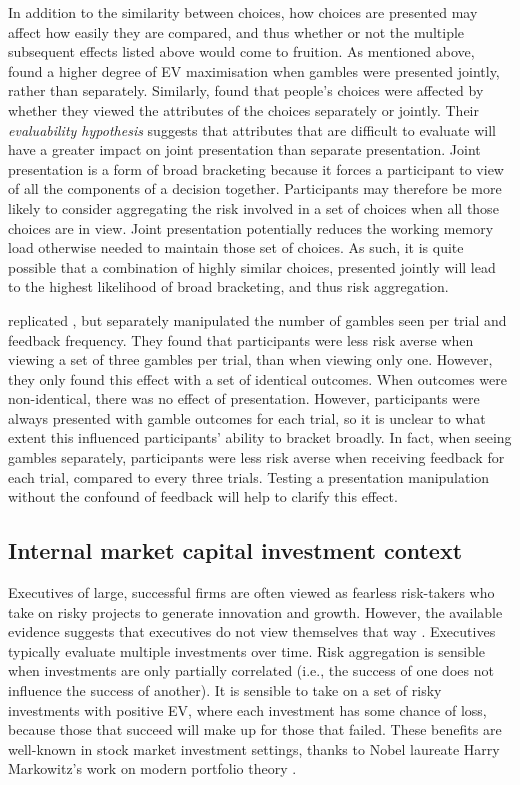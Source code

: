 \documentclass[a4paper, nobind, dvipsnames]{templates/ociamthesis}
\theoremstyle{definition}
\theoremstyle{definition}
\theoremstyle{definition}
\theoremstyle{definition}
\theoremstyle{remark}
\begin{document}
In addition to the similarity between choices, how choices are presented may
affect how easily they are compared, and thus whether or not the multiple
subsequent effects listed above would come to fruition. As mentioned above,
\textcite{haisley2008} found a higher degree of EV maximisation when gambles were
presented jointly, rather than separately. Similarly, \textcite{hsee1999} found that
people's choices were affected by whether they viewed the attributes of the
choices separately or jointly. Their \emph{evaluability hypothesis} suggests that
attributes that are difficult to evaluate will have a greater impact on joint
presentation than separate presentation. Joint presentation is a form of broad
bracketing because it forces a participant to view of all the components of a
decision together. Participants may therefore be more likely to consider
aggregating the risk involved in a set of choices when all those choices are in
view. Joint presentation potentially reduces the working memory load otherwise
needed to maintain those set of choices. As such, it is quite possible that a
combination of highly similar choices, presented jointly will lead to the
highest likelihood of broad bracketing, and thus risk aggregation.

\textcite{moher2010} replicated \textcite{gneezy1997}, but separately manipulated the number of
gambles seen per trial and feedback frequency. They found that participants were
less risk averse when viewing a set of three gambles per trial, than when
viewing only one. However, they only found this effect with a set of identical
outcomes. When outcomes were non-identical, there was no effect of presentation.
However, participants were always presented with gamble outcomes for each trial,
so it is unclear to what extent this influenced participants' ability to bracket
broadly. In fact, when seeing gambles separately, participants were less risk
averse when receiving feedback for each trial, compared to every three trials.
Testing a presentation manipulation without the confound of feedback will help
to clarify this effect.

\subsection{Internal market capital investment context}

Executives of large, successful firms are often viewed as fearless risk-takers
who take on risky projects to generate innovation and growth. However, the
available evidence suggests that executives do not view themselves that way
\autocite{swalm1966,march1987}. Executives typically evaluate multiple investments
over time. Risk aggregation is sensible when investments are only partially
correlated (i.e., the success of one does not influence the success of another).
It is sensible to take on a set of risky investments with positive EV, where
each investment has some chance of loss, because those that succeed will make up
for those that failed. These benefits are well-known in stock market investment
settings, thanks to Nobel laureate Harry Markowitz's work on modern portfolio
theory \autocite*{markowitz1952}.
\end{document}
